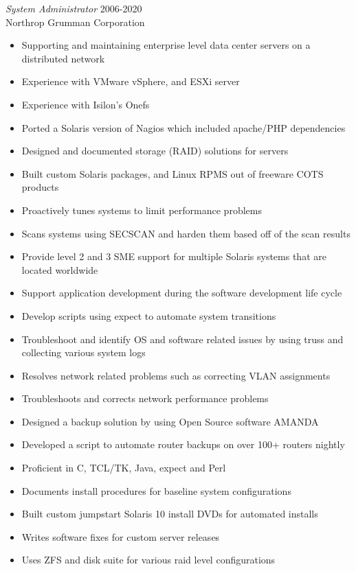 \documentclass[margin, 10pt]{res} %
\begin{document}
\begin{resume}
{\sl System Administrator } \hfill 2006-2020 \\
Northrop Grumman Corporation
\begin{itemize}
  \item Supporting and maintaining enterprise level data center servers on a distributed network
  \item Experience with VMware vSphere, and ESXi server
  \item Experience with Isilon’s Onefs
  \item Ported a Solaris version of Nagios which included apache/PHP dependencies
  \item Designed and documented storage (RAID) solutions for servers
  \item Built custom Solaris packages, and Linux RPMS out of freeware COTS products
  \item Proactively tunes systems to limit performance problems
  \item Scans systems using SECSCAN and harden them based off of the scan results
  \item Provide level 2 and 3 SME support for multiple Solaris systems that are located worldwide
  \item Support application development during the software development life cycle
  \item Develop scripts using expect to automate system transitions
  \item Troubleshoot and identify OS and software related issues by using truss and collecting various system logs
  \item Resolves network related problems such as correcting VLAN assignments
  \item Troubleshoots and corrects network performance problems
  \item Designed a backup solution by using Open Source software AMANDA
  \item Developed a script to automate router backups on over 100+ routers nightly
  \item Proficient in C, TCL/TK, Java, expect and Perl
  \item Documents install procedures for baseline system configurations
  \item Built custom jumpstart Solaris 10 install DVDs for automated installs
  \item Writes software fixes for custom server releases
  \item Uses ZFS and disk suite for various raid level configurations
\end{itemize}


\end{resume}
\end{document}
